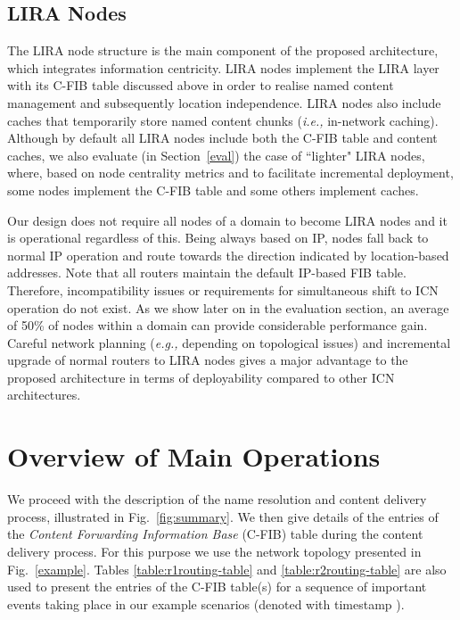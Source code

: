 \documentclass{sig-alternate}
\newcommand{\ie}{{\em i.e.,\/ }}
\newcommand{\eg}{{\em e.g.,\/ }}
\begin{document}
\subsection{LIRA Nodes}\label{lira-nodes}
The LIRA node structure is the main component of the proposed architecture, which integrates information centricity. LIRA nodes implement the LIRA layer with its C-FIB table discussed above in order to realise named content management and subsequently location independence. LIRA nodes also include caches that temporarily store named content chunks (\ie in-network caching). Although by default all LIRA nodes include both the C-FIB table and content caches, we also evaluate (in Section~\ref{eval}) the case of ``lighter" LIRA nodes, where, based on node centrality metrics and to facilitate incremental deployment, some nodes implement the C-FIB table and some others implement caches.

Our design does not require all nodes of a domain to become LIRA nodes and it is operational regardless of this. Being always based on IP, nodes fall back to normal IP operation and route towards the direction indicated by location-based addresses. Note that all routers maintain the default IP-based FIB table. Therefore, incompatibility issues or requirements for simultaneous shift to ICN operation do not exist. As we show later on in the evaluation section, an average of 50\% of nodes within a domain can provide considerable performance gain. Careful network planning (\eg depending on topological issues) and incremental upgrade of normal routers to LIRA nodes gives a major advantage to the proposed architecture in terms of deployability compared to other ICN architectures.

 

\makeatletter{}\section{Overview of Main Operations}\label{rsn-details}

We proceed with the description of the name resolution and content delivery process, illustrated in Fig.~\ref{fig:summary}. We then give details of the entries of the \textit{Content Forwarding Information Base} (C-FIB) table during the content delivery process. For this purpose we use the network topology presented in Fig.~\ref{example}.
Tables \ref{table:r1routing-table} and \ref{table:r2routing-table} are also used to present the entries of the C-FIB table(s) for a sequence of important events taking place in our example scenarios (denoted with timestamp ).
\end{document}
